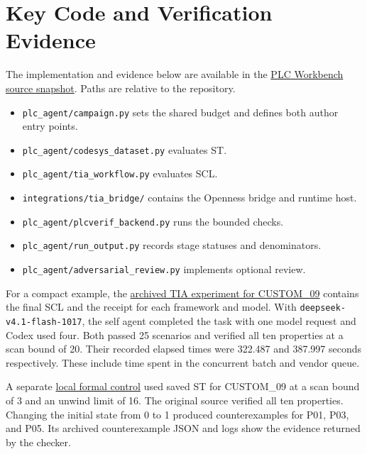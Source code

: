 \section{Key Code and Verification Evidence}
\label{app:evidence}

The implementation and evidence below are available in the
\href{https://github.com/Fish-zjuer/plc-workbench/tree/0eaa0e571043ef8c127945613d483437a37b7b4d}{PLC Workbench source snapshot}. Paths are relative to the repository.

\begin{itemize}
  \item \nolinkurl{plc_agent/campaign.py} sets the shared budget and defines both author entry points.
  \item \nolinkurl{plc_agent/codesys_dataset.py} evaluates ST.
  \item \nolinkurl{plc_agent/tia_workflow.py} evaluates SCL.
  \item \nolinkurl{integrations/tia_bridge/} contains the Openness bridge and runtime host.
  \item \nolinkurl{plc_agent/plcverif_backend.py} runs the bounded checks.
  \item \nolinkurl{plc_agent/run_output.py} records stage statuses and denominators.
  \item \nolinkurl{plc_agent/adversarial_review.py} implements optional review.
\end{itemize}

For a compact example, the
\href{https://github.com/Fish-zjuer/plc-workbench/tree/0eaa0e571043ef8c127945613d483437a37b7b4d/outputs/tia_32x4_20261108_results/tasks/09_CUSTOM_09}{archived TIA experiment for CUSTOM\_09}
contains the final SCL and the receipt for each framework and model. With \texttt{deepseek-v4.1-flash-1017}, the self agent completed the task with one model request and Codex used four. Both passed 25 scenarios and verified all ten properties at a scan bound of 20. Their recorded elapsed times were 322.487 and 387.997 seconds respectively. These include time spent in the concurrent batch and vendor queue.

A separate
\href{https://github.com/Fish-zjuer/plc-workbench/tree/0e44dfbac247943b7a9adc07872a8b8b50c62316/outputs/published/20261108_formal_toolchain_controls_complete}{local formal control}
used saved ST for CUSTOM\_09 at a scan bound of 3 and an unwind limit of 16. The original source verified all ten properties. Changing the initial state from 0 to 1 produced counterexamples for P01, P03, and P05. Its archived counterexample JSON and logs show the evidence returned by the checker.

